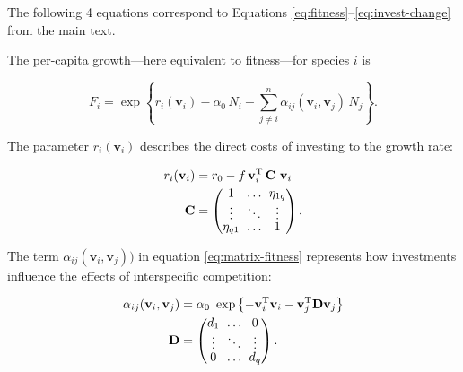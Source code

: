 The following 4 equations correspond to Equations
\ref{eq:fitness}--\ref{eq:invest-change} 
from the main text.

The per-capita growth---here equivalent to fitness---for species $i$ is

\begin{equation} \label{eq:matrix-fitness}
    F_{i} = \exp \left\{ r_i(\mathbf{v}_i) - 
        \alpha_{0} \, N_i - \sum_{j \ne i}^{n}{
            \alpha_{ij}(\mathbf{v}_i, \mathbf{v}_j) \, N_j}  
    \right\}\textrm{.}
\end{equation}

The parameter $r_i(\mathbf{v}_i)$ describes the direct costs of investing to
the growth rate:

\begin{equation} \label{eq:matrix-growth-rate}
\begin{split}
    r_i(\mathbf{v}_i) &= r_0 - f \, \mathbf{v}_i^{\textrm{T}} \, 
        \mathbf{C} ~ \mathbf{v}_{i} \\
    \mathbf{C} &= 
        \begingroup %
        \renewcommand*{\arraystretch}{0.75}
        \setlength\arraycolsep{3pt}
        \begin{pmatrix}
        1         & \ldots & \eta_{1q} \\
        \vdots    & \ddots & \vdots \\
        \eta_{q1} & \ldots & 1      \\
        \end{pmatrix}
        \endgroup
    \textrm{.}
\end{split}
\end{equation}

\newpage{}

The term $\alpha_{ij}(\mathbf{v}_i, \mathbf{v}_j))$ in equation
\ref{eq:matrix-fitness}
represents how investments influence the effects
of interspecific competition:

\begin{equation} \label{eq:matrix-competition}
\begin{split}
    \alpha_{ij}(\mathbf{v}_i, \mathbf{v}_j) &= \alpha_0 ~\exp \left\{
        - \mathbf{v}_i^{\textrm{T}} \mathbf{v}_i -
        \mathbf{v}_j^{\textrm{T}} \mathbf{D} \mathbf{v}_j \right\} \\
    \mathbf{D} &= 
        \begingroup %
        \renewcommand*{\arraystretch}{0.75}
        \setlength\arraycolsep{3pt}
        \begin{pmatrix}
        d_1     & \ldots    & 0 \\
        \vdots  & \ddots    & \vdots \\
        0       & \ldots    & d_q
        \end{pmatrix}
        \endgroup
	\textrm{.}
\end{split}
\end{equation}


